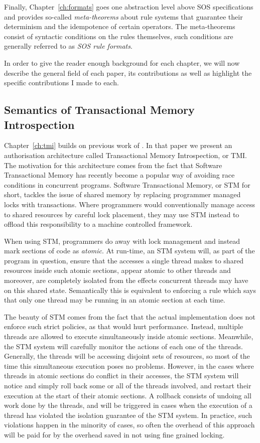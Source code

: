 Finally, Chapter~\ref{ch:formats} goes one abstraction level above SOS specifications
and provides so-called \emph{meta-theorems} about rule systems that guarantee their
determinism and the idempotence of certain operators. The meta-theorems consist of
syntactic conditions on the rules themselves, such conditions are generally referred
to as \emph{SOS rule formats}.

In order to give the reader enough background for each chapter, we will now describe
the general field of each paper, its contributions as well as highlight the specific
contributions I made to each.


\subsection{Semantics of Transactional Memory Introspection}

Chapter~\ref{ch:tmi} builds on previous work of \cite{tmi}. In that paper we present
an authorisation architecture called Transactional Memory Introspection, or TMI.
The motivation for this architecture comes from the fact that Software Transactional
Memory has recently become a popular way of avoiding race conditions in concurrent
programs. Software Transactional Memory, or STM for short, tackles the issue of
shared memory by replacing programmer managed locks with transactions. Where programmers
would conventionally manage access to shared resources by careful lock placement,
they may use STM instead to offload this responsibility to a machine controlled
framework.

When using STM, programmers do away with lock management and instead mark sections
of code as \emph{atomic}. At run-time, an STM system will, as part of the program
in question, ensure that the accesses a single thread makes to shared resources
inside such atomic sections, appear atomic to other threads and moreover, are
completely isolated from the effects concurrent threads may have on this shared
state. Semantically this is equivalent to enforcing a rule which says that only
one thread may be running in an atomic section at each time.

The beauty of STM comes from the fact that the actual implementation 
does not enforce such strict policies, 
as that would hurt performance. Instead, multiple threads are allowed to
execute simultaneously inside atomic sections. Meanwhile, the STM system will carefully
monitor the actions of each one of the threads. Generally, the threads will be
accessing disjoint sets of resources, so most of the time this simultaneous execution
poses no problems. However, in the cases where threads in atomic sections do conflict
in their accesses, the STM system will notice and simply roll back some or all
of the threads involved, and restart their execution at the start of their atomic
sections. A rollback consists of undoing all work done by the threads, and will
be triggered in cases when the execution of a thread has violated the isolation
guarantee of the STM system. In practice, such violations happen in the minority
of cases, so often the overhead of this approach will be paid for by the overhead
saved in not using fine grained locking.

